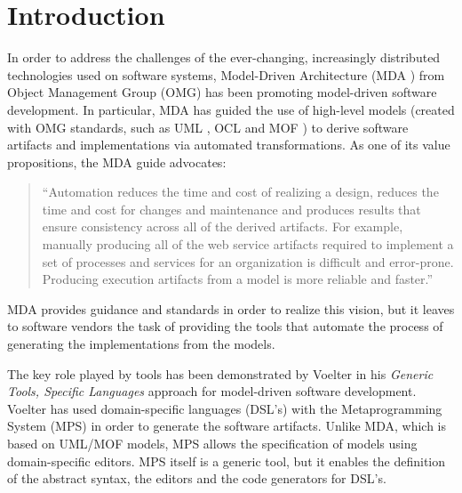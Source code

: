 \section{Introduction}
%
In order to address the challenges of the ever-changing,
increasingly distributed technologies used on software systems,
Model-Driven Architecture (MDA \cite{mda}) from Object Management Group (OMG)
has been promoting model-driven software development.
In particular, MDA has guided the use of high-level models (created with OMG standards,
such as UML \cite{uml}, OCL \cite{ocl} and MOF \cite{mof}) to derive software artifacts and implementations via automated transformations.
As one of its value propositions, the MDA guide \cite{mda} advocates:

\begin{quote}``Automation reduces the time and cost of realizing a design,
reduces the time and cost for changes and maintenance and produces results that ensure consistency across all of the derived artifacts.
For example, manually producing all of the web service artifacts required to implement a set of processes and services for an organization is difficult and error-prone.
Producing execution artifacts from a model is more reliable and faster.''\end{quote} 

MDA provides guidance and standards in order to realize this vision,
but it leaves to software vendors the task of providing the tools that automate the process of generating the implementations from the models.

The key role played by tools has been demonstrated by Voelter \cite{voelter} in his \emph{Generic Tools, Specific Languages} approach for model-driven software development.
Voelter \cite{voelter} has used domain-specific languages (DSL's) with the Metaprogramming System (MPS) in order to generate the software artifacts.
Unlike MDA, which is based on UML/MOF models,
MPS allows the specification of models using domain-specific editors.
MPS itself is a generic tool,
but it enables the definition of the abstract syntax, the editors and the code generators for DSL's.


